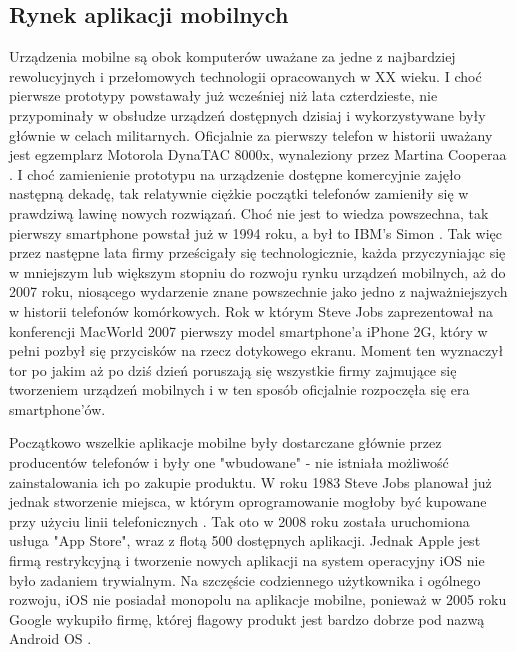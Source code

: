 \documentclass[12pt, a4paper]{article}
\begin{document}
\begin{sloppypar}
{  \subsection{Rynek aplikacji mobilnych}
  {
    Urządzenia mobilne są obok komputerów uważane za jedne z najbardziej rewolucyjnych
    i przełomowych technologii opracowanych w XX wieku. I choć pierwsze prototypy 
    powstawały już wcześniej niż lata czterdzieste, nie przypominały w obsłudze urządzeń
    dostępnych dzisiaj i wykorzystywane były głównie w celach militarnych.
    Oficjalnie za pierwszy telefon w historii uważany jest egzemplarz Motorola 
    DynaTAC 8000x, wynaleziony przez Martina Cooperaa \cite{history1}. I choć
    zamienienie prototypu na urządzenie dostępne
    komercyjnie zajęło następną dekadę, tak relatywnie ciężkie początki telefonów
    zamieniły się w prawdziwą lawinę nowych rozwiązań. Choć nie jest to wiedza
    powszechna, tak pierwszy smartphone powstał już w 1994 roku, a był to IBM's Simon
    \cite{history2}. Tak więc przez następne lata firmy prześcigały się technologicznie,
    każda przyczyniając się w mniejszym lub większym stopniu do rozwoju rynku urządzeń
    mobilnych, aż do 2007 roku, niosącego wydarzenie znane powszechnie jako jedno 
    z najważniejszych w historii telefonów komórkowych. Rok w którym Steve Jobs 
    zaprezentował na konferencji MacWorld 2007 pierwszy model smartphone'a iPhone 2G,
    który w pełni pozbył się przycisków na rzecz dotykowego ekranu. Moment ten wyznaczył
    tor po jakim aż po dziś dzień poruszają się wszystkie firmy zajmujące się tworzeniem
    urządzeń mobilnych i w ten sposób oficjalnie rozpoczęła się era smartphone'ów.

    Początkowo wszelkie aplikacje mobilne były dostarczane głównie przez producentów
    telefonów i były one "wbudowane" - nie istniała możliwość zainstalowania
    ich po zakupie produktu. W roku 1983 Steve Jobs planował już jednak stworzenie
    miejsca, w którym oprogramowanie mogłoby być kupowane przy użyciu linii
    telefonicznych \cite{history4}. Tak oto w 2008 roku została uruchomiona usługa
    "App Store", wraz z flotą 500 dostępnych aplikacji. Jednak Apple jest firmą
    restrykcyjną i tworzenie nowych aplikacji na system operacyjny iOS nie było 
    zadaniem trywialnym. Na szczęście codziennego użytkownika i ogólnego rozwoju, 
    iOS nie posiadał monopolu na aplikacje mobilne, ponieważ w 2005 roku Google
    wykupiło firmę, której flagowy produkt jest bardzo dobrze pod nazwą Android OS
    \cite{history3}.

}}
\end{sloppypar}
\end{document}
